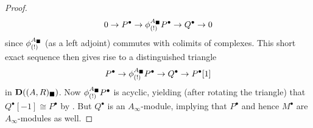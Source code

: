 \begin{proof}
	$$0\to P^\bullet \to {\phi_{(!)}^{A_\blacksquare}}P^\bullet \to Q^\bullet \to 0$$
	since ${\phi_{(!)}^{A_\blacksquare}}$ (as a left adjoint) commutes with colimits of complexes. This short exact sequence then gives rise to a distinguished triangle
	$$P^\bullet \to {\phi_{(!)}^{A_\blacksquare}}P^\bullet \to Q^\bullet \to P^\bullet[1]$$
	in ${{\mathbf{D}}((A, R)_\blacksquare)}$. Now ${\phi_{(!)}^{A_\blacksquare}}P^\bullet$ is acyclic, yielding (after rotating the triangle) that $Q^\bullet[-1] \cong P^\bullet$ by \cite[\href{https://stacks.math.columbia.edu/tag/05QR}{Tag 05QR}]{stacks-project}. But $Q^\bullet$ is an $A_\infty$-module, implying that $P^\bullet$ and hence $M^\bullet$ are $A_\infty$-modules as well.
\end{proof}

